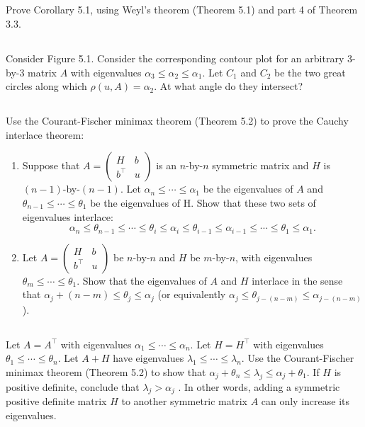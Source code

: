 \documentclass[a4paper]{ctexart}
\newcommand{\pf}{\textbf{\color{pink}{proof:}}}
\newcommand{\bymn}[2]{$#1$-by-$#2$}
\newcommand{\ttmat}[4]{\begin{pmatrix}#1&#2\\#3&#4\end{pmatrix}}
\begin{document}
\pf

\subsection{}
Prove Corollary 5.1, using Weyl's theorem (Theorem 5.1) and part 4 of Theorem 3.3.

\pf

\subsection{}
Consider Figure 5.1. Consider the corresponding
contour plot for an arbitrary $3$-by-$3$ matrix $A$ with eigenvalues $\alpha_3 \le \alpha_2 \le \alpha_1$.
Let $C_1$ and $C_2$ be the two great circles along which $\rho(u, A) = \alpha_2$. At what
angle do they intersect?

\pf

\subsection{}
Use the Courant-Fischer minimax theorem (Theorem 5.2) to prove the Cauchy interlace theorem:
\begin{enumerate}
    \item Suppose that $A = \begin{pmatrix}
        H&b\\b^\top&u
    \end{pmatrix}$ is an $n$-by-$n$ symmetric matrix and $H$ is
    $(n - 1)$-by-$(n - 1)$. Let $\alpha_n \le \cdots \le \alpha_1$ be the eigenvalues of $A$ and
    $\theta_{n-1} \le \cdots\le \theta_1$ be the eigenvalues of H. Show that these two sets of
    eigenvalues interlace:
    \begin{equation*}
        \alpha_n\le\theta_{n-1}\le\cdots\le\theta_i\le\alpha_i\le\theta_{i-1}\le\alpha_{i-1}\le\cdots\le\theta_1\le\alpha_1.
    \end{equation*}
    \item Let $A = \ttmat{H}{b}{b^\top}{u}$ be \bymn{n}{n} and $H$ be \bymn{m}{n},  with eigenvalues $\theta_m \le\cdots \le \theta_1$.
    Show that the eigenvalues of $A$ and $H$ interlace in the sense
    that $\alpha_j+(n-m) \le \theta_j \le \alpha_j$ (or equivalently $\alpha_j \le \theta_{j-(n-m)} \le \alpha_{j-(n-m)}$).
\end{enumerate}

\pf

\subsection{}
Let $A = A^\top$ with eigenvalues $\alpha_1 \le \cdots \le \alpha_n$. Let
$H = H^\top$ with eigenvalues $\theta_1 \le \cdots \le \theta_n$. Let $A + H$ have eigenvalues 
$\lambda_1 \le \cdots \le \lambda_n$. Use the Courant-Fischer minimax theorem (Theorem 5.2) to show
that $\alpha_j + \theta_n \le \lambda_j \le \alpha_j + \theta_1$. If $H$ is positive definite, conclude that $\lambda_j > \alpha_j$ .
In other words, adding a symmetric positive definite matrix $H$ to another
symmetric matrix $A$ can only increase its eigenvalues.
\end{document}
